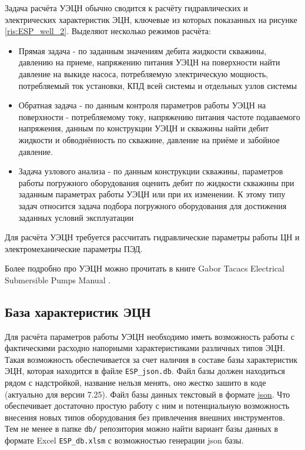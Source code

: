 Задача расчёта УЭЦН обычно сводится к расчёту гидравлических и электрических характеристик ЭЦН, ключевые из которых показанных на рисунке \ref{ris:ESP_well_2}. Выделяют несколько режимов расчёта:
\begin{itemize}
	\item Прямая задача - по заданным значениям дебита жидкости скважины,  давлению на приеме, напряжению питания УЭЦН на поверхности найти давление на выкиде насоса, потребляемую электрическую мощность, потребляемый ток установки, КПД всей системы и отдельных узлов системы
	\item Обратная задача - по данным контроля параметров работы УЭЦН на поверхности - потребляемому току, напряжению питания частоте подаваемого напряжения, данным по конструкции УЭЦН и скважины найти дебит жидкости и обводнённость по скважине, давление на приёме и забойное давление.
	\item Задача узлового анализа - по данным конструкции скважины, параметров работы погружного оборудования оценить дебит по жидкости скважины при заданным параметрах работы УЭЦН или при их изменении. К этому типу задач относится задача подбора погружного оборудования для достижения заданных условий эксплуатации 
	
\end{itemize}

Для расчёта УЭЦН требуется рассчитать гидравлические параметры работы ЦН и электромеханические параметры ПЭД.

Более подробно про УЭЦН можно прочитать в книге Gabor Tacacs Electrical Submersible Pumps Manual \cite{Gabor_ESP}.

\subsection{База характеристик ЭЦН}
Для расчёта параметров работы УЭЦН необходимо иметь возможность работы с фактическими расходно напорными характеристиками различных типов ЭЦН. Такая возможность обеспечивается за счет наличия в составе \unf{} базы характеристик ЭЦН, которая находится в файле \texttt{ESP_json.db}. Файл базы должен находиться рядом с надстройкой, название нельзя менять, оно жестко зашито в коде (актуально для версии 7.25).
Файл базы данных текстовый в формате \href{https://ru.wikipedia.org/wiki/JSON}{json}. Что обеспечивает достаточно простую работу с ним и потенциальную возможность внесения новых типов оборудования без привлечения внешних инструментов. Тем не менее в папке \texttt{db/} репозитория можно найти вариант базы данных в формате Excel \texttt{ESP_db.xlsm} с возможностью генерации json базы.    

